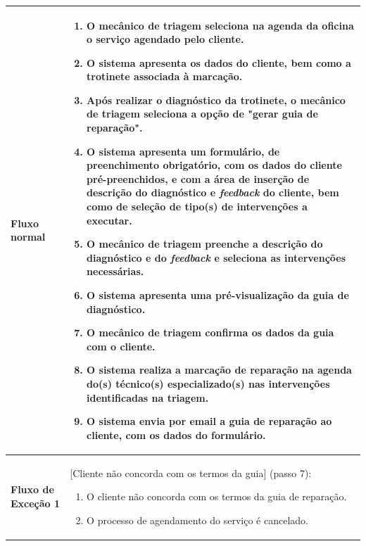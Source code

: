 \documentclass[a4paper,12pt]{scrreprt}
\begin{document}
\begin{longtable}{|>{\columncolor{black!10}\bfseries}p{3.5cm}|p{11.5cm}|}
Fluxo normal & 
\begin{enumerate}[leftmargin=*, nosep, topsep=2pt, partopsep=0pt]
    \item O mecânico de triagem seleciona na agenda da oficina o serviço agendado pelo cliente.
    \item O sistema apresenta os dados do cliente, bem como a trotinete associada à marcação.
    \item Após realizar o diagnóstico da trotinete, o mecânico de triagem seleciona a opção de "gerar guia de reparação".
    \item O sistema apresenta um formulário, de preenchimento obrigatório, com os dados do cliente pré-preenchidos, e com a área de inserção de descrição do diagnóstico e \textit{feedback} do cliente, bem como de seleção de tipo(s) de intervenções a executar.
    \item O mecânico de triagem preenche a descrição do diagnóstico e do \textit{feedback} e seleciona as intervenções necessárias.
    \item O sistema apresenta uma pré-visualização da guia de diagnóstico.
    \item O mecânico de triagem confirma os dados da guia com o cliente.
    \item O sistema realiza a marcação de reparação na agenda do(s) técnico(s) especializado(s) nas intervenções identificadas na triagem.
    \item O sistema envia por email a guia de reparação ao cliente, com os dados do formulário.
\end{enumerate} \\ \hline

Fluxo de Exceção 1 & [Cliente não concorda com os termos da guia] (passo 7):
\begin{enumerate}[label=7.\arabic*., leftmargin=*, nosep, topsep=2pt, partopsep=0pt]
    \item O cliente não concorda com os termos da guia de reparação.
    \item O processo de agendamento do serviço é cancelado.
\end{enumerate} \\ \hline

\end{longtable}
\end{document}

